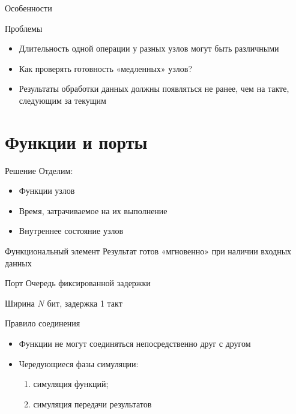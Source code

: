 \begin{frame}{Особенности}

\end{frame}

\begin{frame}{Проблемы}
\begin{itemize}
\item Длительность одной операции у разных узлов могут быть различными
\item Как проверять готовность «медленных» узлов?
\item Результаты обработки данных должны появляться не ранее, чем на такте, следующим за текущим
\end{itemize}

\end{frame}

\section{Функции и порты}

\begin{frame}{Решение}
Отделим:
    \begin{itemize}
    \item Функции узлов
    \item Время, затрачиваемое на их выполнение
    \item Внутреннее состояние узлов
    \end{itemize}
\end{frame}

\begin{frame}{Функциональный элемент}
Результат готов «мгновенно» при наличии входных данных

\vfill
\centering
{}

\end{frame}

\begin{frame}{Порт}
Очередь фиксированной задержки

Ширина $N$ бит, задержка 1 такт

\vfill
\centering
{}

\end{frame}

\begin{frame}{Правило соединения}

\begin{itemize}
\item Функции не могут соединяться непосредственно друг с другом
\item Чередующиеся фазы симуляции:
\begin{enumerate}
    \item симуляция функций;
    \item симуляция передачи результатов
\end{enumerate}
\end{itemize}
\end{frame}

